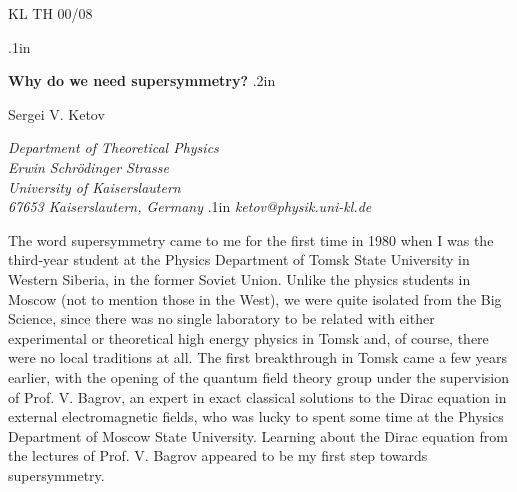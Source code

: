 \documentclass[a4paper,a4paper]{article}
\begin{document}
\begin{flushleft}
KL TH 00/08
\end{flushleft}
\vglue.1in

\begin{center}
\textbf{Why do we need supersymmetry?}
\vglue.2in

Sergei V. Ketov 

{\it Department of Theoretical Physics\\
     Erwin Schr\"odinger Strasse \\
     University of Kaiserslautern}\\
{\it 67653 Kaiserslautern, Germany}
\vglue.1in
{\sl ketov@physik.uni-kl.de}
\end{center}

The word supersymmetry came to me for the first time in 1980 when I was the 
third-year student at the Physics Department of Tomsk State University in 
Western Siberia, in the former Soviet Union. Unlike the physics students in 
Moscow (not to mention those in the West), we were quite isolated from the Big
 Science, since there was no single laboratory to be related with either
experimental or theoretical high energy physics in Tomsk and, of course, there
were no local traditions at all. The first breakthrough in Tomsk came a few 
years earlier, with the opening of the quantum field theory group under the 
supervision of Prof. V. Bagrov, an expert in exact classical solutions to the 
Dirac equation in external electromagnetic fields, who was lucky to spent some
 time at the Physics Department of Moscow State University. Learning about the
 Dirac equation from the lectures of Prof. V. Bagrov appeared to be my first 
step towards supersymmetry. 
\end{document}
